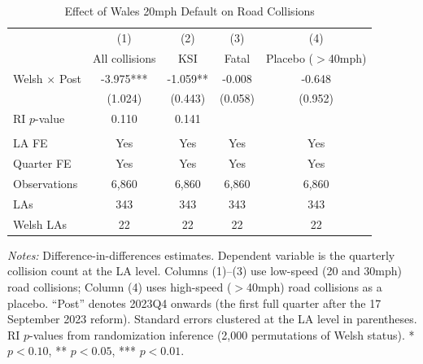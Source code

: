 \begin{table}[H]
\centering
\caption{Effect of Wales 20mph Default on Road Collisions}
\label{tab:main}
\begin{threeparttable}
\begin{tabular}{l cccc}
\toprule
& (1) & (2) & (3) & (4) \\
& All collisions & KSI & Fatal & Placebo ($>$40mph) \\
\midrule
Welsh $\times$ Post & -3.975*** & -1.059** & -0.008 & -0.648 \\
& (1.024) & (0.443) & (0.058) & (0.952) \\
RI $p$-value & 0.110 & 0.141 & & \\
\\
LA FE & Yes & Yes & Yes & Yes \\
Quarter FE & Yes & Yes & Yes & Yes \\
Observations & 6,860 & 6,860 & 6,860 & 6,860 \\
LAs & 343 & 343 & 343 & 343 \\
Welsh LAs & 22 & 22 & 22 & 22 \\
\bottomrule
\end{tabular}
\begin{tablenotes}[flushleft]
\small
\item \textit{Notes:} Difference-in-differences estimates. Dependent variable is the quarterly collision count at the LA level. Columns (1)--(3) use low-speed (20 and 30mph) road collisions; Column (4) uses high-speed ($>$40mph) road collisions as a placebo. ``Post'' denotes 2023Q4 onwards (the first full quarter after the 17 September 2023 reform). Standard errors clustered at the LA level in parentheses. RI $p$-values from randomization inference (2,000 permutations of Welsh status). * $p<0.10$, ** $p<0.05$, *** $p<0.01$.
\end{tablenotes}
\end{threeparttable}
\end{table}
